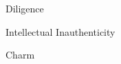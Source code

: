 \documentclass[aspectratio=169]{beamer}
\begin{document}
\begin{frame}
  \begin{center}
    \Huge Diligence
    \\ \small \cite{clanceimes78}

  \end{center}
\end{frame}

\begin{frame}
  \begin{center}
    \Huge Intellectual Inauthenticity
    \\ \small \cite{clanceimes78}
  \end{center}
\end{frame}

\begin{frame}
  \begin{center}
    \Huge Charm
    \\ \small \cite{clanceimes78}
  \end{center}
\end{frame}
\end{document}
